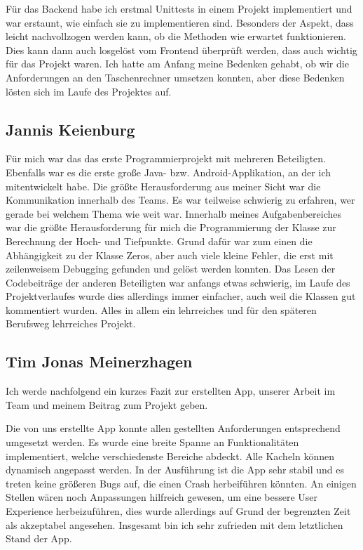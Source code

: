 Für das Backend habe ich erstmal Unittests in einem Projekt implementiert und war erstaunt, wie einfach sie zu implementieren sind. Besonders der Aspekt, dass leicht nachvollzogen werden kann, ob die Methoden wie erwartet funktionieren. Dies kann dann auch losgelöst vom Frontend überprüft werden, dass auch wichtig für das Projekt waren.
Ich hatte am Anfang meine Bedenken gehabt, ob wir die Anforderungen an den Taschenrechner umsetzen konnten, aber diese Bedenken lösten sich im Laufe des Projektes auf.

\clearpage

\subsection{Jannis Keienburg}
Für mich war das das erste Programmierprojekt mit mehreren Beteiligten. Ebenfalls war es die erste große Java- bzw. Android-Applikation, an der ich mitentwickelt habe. Die größte Herausforderung aus meiner Sicht war die Kommunikation innerhalb des Teams. Es war teilweise schwierig zu erfahren, wer gerade bei welchem Thema wie weit war. Innerhalb meines Aufgabenbereiches war die größte Herausforderung für mich die Programmierung der Klasse zur Berechnung der Hoch- und Tiefpunkte. Grund dafür war zum einen die Abhängigkeit zu der Klasse Zeros, aber auch viele kleine Fehler, die erst mit zeilenweisem Debugging gefunden und gelöst werden konnten. Das Lesen der Codebeiträge der anderen Beteiligten war anfangs etwas schwierig, im Laufe des Projektverlaufes wurde dies allerdings immer einfacher, auch weil die Klassen gut kommentiert wurden. Alles in allem ein lehrreiches und für den späteren Berufsweg lehrreiches Projekt.

\clearpage

\subsection{Tim Jonas Meinerzhagen}
Ich werde nachfolgend ein kurzes Fazit zur erstellten App, unserer Arbeit im Team und meinem Beitrag zum Projekt geben.

Die von uns erstellte App konnte allen gestellten Anforderungen entsprechend umgesetzt werden. Es wurde eine breite Spanne an Funktionalitäten implementiert, welche verschiedenste Bereiche abdeckt. Alle Kacheln können dynamisch angepasst werden. In der Ausführung ist die App sehr stabil und es treten keine größeren Bugs auf, die einen Crash herbeiführen könnten. An einigen Stellen wären noch Anpassungen hilfreich gewesen, um eine bessere User Experience herbeizuführen, dies wurde allerdings auf Grund der begrenzten Zeit als akzeptabel angesehen. Insgesamt bin ich sehr zufrieden mit dem letztlichen Stand der App.

